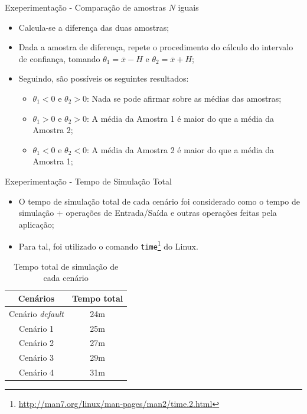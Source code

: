 \documentclass[xcolor=dvipsnames]{beamer}
\let\olditem=\item%
\renewcommand{\item}{\olditem \justifying}%
\begin{document}
\begin{frame}{Exeperimentação - Comparação de amostras $N$ iguais}
	\begin{itemize}
		\item Calcula-se a diferença das duas amostras;
		      \bigskip
		\item Dada a amostra de diferença, repete o procedimento do cálculo do intervalo de confiança, tomando $\theta_{1}=\overline{x}-H$ e $\theta_{2}=\overline{x}+H$;
		      \bigskip
		\item Seguindo, são possíveis os seguintes resultados:
		      \begin{itemize}
		      	\item $\theta_{1}<0$ e $\theta_{2}>0$: Nada se pode afirmar sobre as médias das amostras;
		      	      \bigskip
		      	\item $\theta_{1}>0$ e $\theta_{2}>0$: A média da Amostra 1 é maior do que a média da Amostra 2;
		      	      \bigskip
		      	\item $\theta_{1}<0$ e $\theta_{2}<0$: A média da Amostra 2 é maior do que a média da Amostra 1;
		      \end{itemize}
	\end{itemize}
\end{frame}
	
\begin{frame}{Exeperimentação - Tempo de Simulação Total}
	\begin{itemize}
		\item O tempo de simulação total de cada cenário foi considerado como o tempo de simulação + operações de Entrada/Saída e outras operações feitas pela aplicação;
		      				
		      \bigskip
		      				
		\item Para tal, foi utilizado o comando \texttt{time}\footnote{\url{http://man7.org/linux/man-pages/man2/time.2.html}} do Linux.
	\end{itemize}
			
	\begin{table}[H]
		\centering
		\begin{tabular}{|c|c|}
			\hline
			\textbf{Cenários}        & \textbf{Tempo total} \\ \hline
			Cenário \textit{default} & 24m                  \\ \hline
			Cenário 1                & 25m                  \\ \hline
			Cenário 2                & 27m                  \\ \hline
			Cenário 3                & 29m                  \\ \hline
			Cenário 4                & 31m                  \\ \hline
		\end{tabular}
		\caption {Tempo total de simulação de cada cenário}
	\end{table}
				
\end{frame}
		
\end{document}
